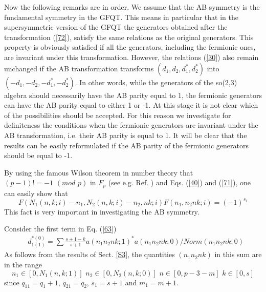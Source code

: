 \documentclass[a4paper,12pt]{article}%
\begin{document}
Now the following remarks are in order. We assume that 
the AB symmetry is the fundamental symmetry in the 
GFQT. This means in particular that in
the supersymmetric version of the GFQT the generators
obtained after the transformation (\ref{72}), satisfy
the same relations as the
original generators. This property is obviously
satisfied if all the generators, including the
fermionic ones, are invariant under this 
transformation. However, the relations (\ref{30}) 
also remain unchanged if the AB transformation
transforms $(d_1,d_2,d_1^*,d_2^*)$ into
$(-d_1,-d_2,-d_1^*,-d_2^*)$. In other words, while
the generators of the so(2,3) algebra should
necessarily have the AB parity equal to 1, the
fermionic generators can have the AB parity equal
to either 1 or -1. At this stage it is not clear 
which of the possibilities should be accepted. For
this reason we investigate for definiteness the
conditions when the fermionic generators are
invariant under the AB transformation, i.e. their
AB parity is equal to 1. It will be clear that the
results can be easily reformulated if the AB parity
of the fermionic generators should be equal to -1. 

By using the famous Wilson theorem in number
theory that $(p-1)!=-1\,\, (mod\,\, p)$ in $F_p$
(see e.g. Ref. \cite{VDW}) and Eqs. (\ref{40})
and (\ref{71}), one can easily show that
\begin{equation}
F(N_1(n,k;i)-n_1,N_2(n,k;i)-n_2,nk;i)F(n_1,n_2nk;i)=(-1)^{s_i}
\label{75}
\end{equation} 
This fact is very important in investigating the
AB symmetry. 

Consider the first term in Eq. (\ref{63})
\begin{eqnarray}
&d_{1(1)}^{*(0)}=\sum \frac{s+1-k}{s+1}a(n_1n_2nk;1)^*
a(n_1n_2nk;0)/Norm(n_1n_2nk;0)
\label{76}
\end{eqnarray}
As follows from the results of Sect. \ref{S3}, the
quantities $(n_1n_2nk)$ in this sum are in the range
\begin{equation}
n_1\in [0,N_1(n,k;1)]\,\, n_2\in [0,N_2(n,k;0)] \,\,
 n\in [0,p-3-m]\,\, k\in [0,s]
\label{77}
\end{equation}
since $q_{11}=q_1+1$, $q_{21}=q_2$, $s_1=s+1$ and 
$m_1=m+1$.
\end{document}
